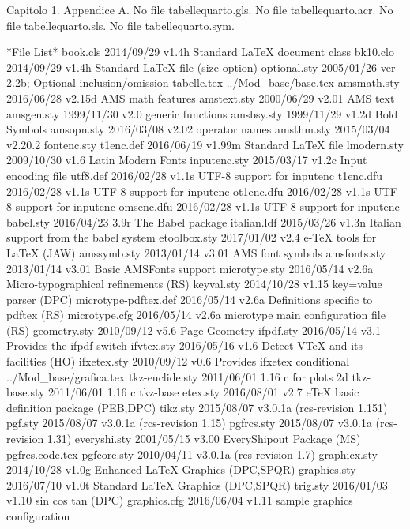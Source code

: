 Capitolo 1.
Appendice A.
No file tabellequarto.gls.
No file tabellequarto.acr.
No file tabellequarto.sls.
No file tabellequarto.sym.

 *File List*
    book.cls    2014/09/29 v1.4h Standard LaTeX document class
    bk10.clo    2014/09/29 v1.4h Standard LaTeX file (size option)
optional.sty    2005/01/26 ver 2.2b;  Optional inclusion/omission
 tabelle.tex
../Mod_base/base.tex
 amsmath.sty    2016/06/28 v2.15d AMS math features
 amstext.sty    2000/06/29 v2.01 AMS text
  amsgen.sty    1999/11/30 v2.0 generic functions
  amsbsy.sty    1999/11/29 v1.2d Bold Symbols
  amsopn.sty    2016/03/08 v2.02 operator names
  amsthm.sty    2015/03/04 v2.20.2
 fontenc.sty
   t1enc.def    2016/06/19 v1.99m Standard LaTeX file
 lmodern.sty    2009/10/30 v1.6 Latin Modern Fonts
inputenc.sty    2015/03/17 v1.2c Input encoding file
    utf8.def    2016/02/28 v1.1s UTF-8 support for inputenc
   t1enc.dfu    2016/02/28 v1.1s UTF-8 support for inputenc
  ot1enc.dfu    2016/02/28 v1.1s UTF-8 support for inputenc
  omsenc.dfu    2016/02/28 v1.1s UTF-8 support for inputenc
   babel.sty    2016/04/23 3.9r The Babel package
 italian.ldf    2015/03/26 v1.3n Italian support from the babel system
etoolbox.sty    2017/01/02 v2.4 e-TeX tools for LaTeX (JAW)
 amssymb.sty    2013/01/14 v3.01 AMS font symbols
amsfonts.sty    2013/01/14 v3.01 Basic AMSFonts support
microtype.sty    2016/05/14 v2.6a Micro-typographical refinements (RS)
  keyval.sty    2014/10/28 v1.15 key=value parser (DPC)
microtype-pdftex.def    2016/05/14 v2.6a Definitions specific to pdftex (RS)
microtype.cfg    2016/05/14 v2.6a microtype main configuration file (RS)
geometry.sty    2010/09/12 v5.6 Page Geometry
   ifpdf.sty    2016/05/14 v3.1 Provides the ifpdf switch
  ifvtex.sty    2016/05/16 v1.6 Detect VTeX and its facilities (HO)
 ifxetex.sty    2010/09/12 v0.6 Provides ifxetex conditional
../Mod_base/grafica.tex
tkz-euclide.sty    2011/06/01 1.16 c for plots 2d 
tkz-base.sty    2011/06/01 1.16 c tkz-base
    etex.sty    2016/08/01 v2.7 eTeX basic definition package (PEB,DPC)
    tikz.sty    2015/08/07 v3.0.1a (rcs-revision 1.151)
     pgf.sty    2015/08/07 v3.0.1a (rcs-revision 1.15)
  pgfrcs.sty    2015/08/07 v3.0.1a (rcs-revision 1.31)
everyshi.sty    2001/05/15 v3.00 EveryShipout Package (MS)
  pgfrcs.code.tex
 pgfcore.sty    2010/04/11 v3.0.1a (rcs-revision 1.7)
graphicx.sty    2014/10/28 v1.0g Enhanced LaTeX Graphics (DPC,SPQR)
graphics.sty    2016/07/10 v1.0t Standard LaTeX Graphics (DPC,SPQR)
    trig.sty    2016/01/03 v1.10 sin cos tan (DPC)
graphics.cfg    2016/06/04 v1.11 sample graphics configuration
